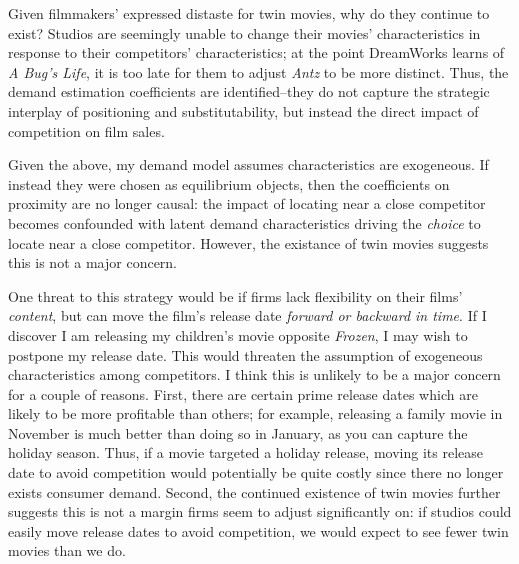 \documentclass{article}
\begin{document}
Given filmmakers' expressed distaste for twin movies, why do they continue to exist? Studios are seemingly unable to change their movies' characteristics in response to their competitors' characteristics; at the point DreamWorks learns of \emph{A Bug's Life}, it is too late for them to adjust \emph{Antz} to be more distinct. Thus, the demand estimation coefficients are identified--they do not capture the strategic interplay of positioning and substitutability, but instead the direct impact of competition on film sales.

Given the above, my demand model assumes characteristics are exogeneous. If instead they were chosen as equilibrium objects, then the coefficients on proximity are no longer causal: the impact of locating near a close competitor becomes confounded with latent demand characteristics driving the \emph{choice} to locate near a close competitor. However, the existance of twin movies suggests this is not a major concern.




One threat to this strategy would be if firms lack flexibility on their films' \emph{content}, but can move the film's release date \emph{forward or backward in time}. If I discover I am releasing my children's movie opposite \emph{Frozen}, I may wish to postpone my release date. This would threaten the assumption of exogeneous characteristics among competitors. I think this is unlikely to be a major concern for a couple of reasons. First, there are certain prime release dates which are likely to be more profitable than others; for example, releasing a family movie in November is much better than doing so in January, as you can capture the holiday season. Thus, if a movie targeted a holiday release, moving its release date to avoid competition would potentially be quite costly since there no longer exists consumer demand. Second, the continued existence of twin movies further suggests this is not a margin firms seem to adjust significantly on: if studios could easily move release dates to avoid competition, we would expect to see fewer twin movies than we do. 
\end{document}
